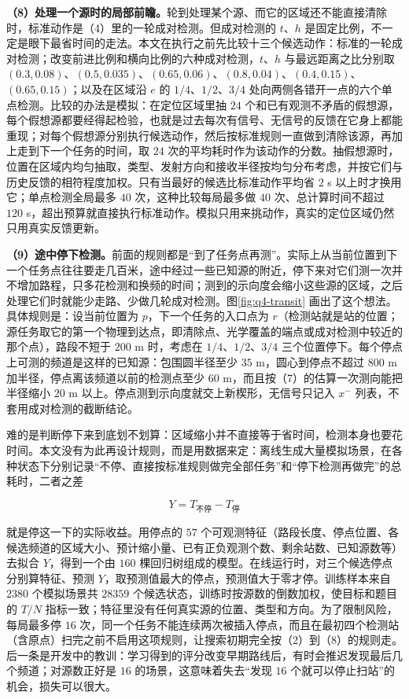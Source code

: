 \textbf{（8）处理一个源时的局部前瞻。}轮到处理某个源、而它的区域还不能直接清除时，标准动作是（4）里的一轮成对检测。但成对检测的 $t$、$h$ 是固定比例，不一定是眼下最省时间的走法。本文在执行之前先比较十三个候选动作：标准的一轮成对检测；改变前进比例和横向比例的六种成对检测，$t$、$h$ 与最远距离之比分别取 $(0.3,0.08)$、$(0.5,0.035)$、$(0.65,0.06)$、$(0.8,0.04)$、$(0.4,0.15)$、$(0.65,0.15)$；以及在区域沿 $e$ 的 $1/4$、$1/2$、$3/4$ 处向两侧各错开一点的六个单点检测。比较的办法是模拟：在定位区域里抽 $24$ 个和已有观测不矛盾的假想源，每个假想源都要经得起检验，也就是过去每次有信号、无信号的反馈在它身上都能重现；对每个假想源分别执行候选动作，然后按标准规则一直做到清除该源，再加上走到下一个任务的时间，取 $24$ 次的平均耗时作为该动作的分数。抽假想源时，位置在区域内均匀抽取，类型、发射方向和接收半径按均匀分布考虑，并按它们与历史反馈的相符程度加权。只有当最好的候选比标准动作平均省 $2$ s 以上时才换用它；单点检测全局最多 $40$ 次，这种比较每局最多做 $40$ 次、总计算时间不超过 $120$ s，超出预算就直接执行标准动作。模拟只用来挑动作，真实的定位区域仍然只用真实反馈更新。

\textbf{（9）途中停下检测。}前面的规则都是“到了任务点再测”。实际上从当前位置到下一个任务点往往要走几百米，途中经过一些已知源的附近，停下来对它们测一次并不增加路程，只多花检测和换频的时间；测到的示向度会缩小这些源的区域，之后处理它们时就能少走路、少做几轮成对检测。图\ref{fig:q4-transit} 画出了这个想法。具体规则是：设当前位置为 $p$，下一个任务的入口点为 $r$（检测站就是站的位置；源任务取它的第一个物理到达点，即清除点、光学覆盖的端点或成对检测中较近的那个点），路段不短于 $200$ m 时，考虑在 $1/4$、$1/2$、$3/4$ 三个位置停下。每个停点上可测的频道是这样的已知源：包围圆半径至少 $35$ m，圆心到停点不超过 $800$ m 加半径，停点离该频道以前的检测点至少 $60$ m，而且按（7）的估算一次测向能把半径缩小 $20$ m 以上。停点测到示向度就交上新楔形，无信号只记入 $x^-$ 列表，不套用成对检测的截断结论。

难的是判断停下来到底划不划算：区域缩小并不直接等于省时间，检测本身也要花时间。本文没有为此再设计规则，而是用数据来定：离线生成大量模拟场景，在各种状态下分别记录“不停、直接按标准规则做完全部任务”和“停下检测再做完”的总耗时，二者之差

\begin{equation}\label{eq:q4-4}
Y=T_{\text{不停}}-T_{\text{停}}
\end{equation}

就是停这一下的实际收益。用停点的 $57$ 个可观测特征（路段长度、停点位置、各候选频道的区域大小、预计缩小量、已有正负观测个数、剩余站数、已知源数等）去拟合 $Y$，得到一个由 $160$ 棵回归树组成的模型。在线运行时，对三个候选停点分别算特征、预测 $Y$，取预测值最大的停点，预测值大于零才停。训练样本来自 $2380$ 个模拟场景共 $28359$ 个候选状态，训练时按源数的倒数加权，使目标和题目的 $T/N$ 指标一致；特征里没有任何真实源的位置、类型和方向。为了限制风险，每局最多停 $16$ 次，同一个任务不能连续两次被插入停点，而且在最初四个检测站（含原点）扫完之前不启用这项规则，让搜索初期完全按（2）到（8）的规则走。后一条是开发中的教训：学习得到的评分改变早期路线后，有时会推迟发现最后几个频道；对源数正好是 $16$ 的场景，这意味着失去“发现 $16$ 个就可以停止扫站”的机会，损失可以很大。

